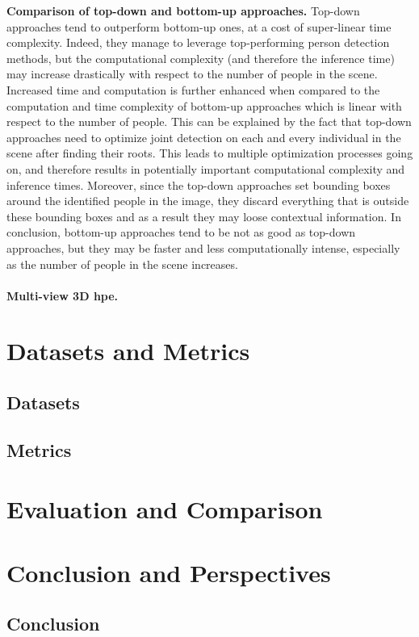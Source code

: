 \documentclass[runningheads]{llncs}
\begin{document}
\textbf{Comparison of top-down and bottom-up approaches.} Top-down approaches tend to outperform bottom-up ones, at a cost of super-linear time complexity. Indeed, they manage to leverage top-performing person detection methods, but the computational complexity (and therefore the inference time) may increase drastically with respect to the number of people in the scene. Increased time and computation is further enhanced when compared to the computation and time complexity of bottom-up approaches which is linear with respect to the number of people. This can be explained by the fact that top-down approaches need to optimize joint detection on each and every individual in the scene after finding their roots. This leads to multiple optimization processes going on, and therefore results in potentially important computational complexity and inference times. Moreover, since the top-down approaches set bounding boxes around the identified people in the image, they discard everything that is outside these bounding boxes and as a result they may loose contextual information. In conclusion, bottom-up approaches tend to be not as good as top-down approaches, but they may be faster and less computationally intense, especially as the number of people in the scene increases.


\paragraph{Multi-view 3D \ac{hpe}.}

\section{Datasets and Metrics}
\subsection{Datasets}
\subsection{Metrics}

\section{Evaluation and Comparison}

\section{Conclusion and Perspectives}
\subsection{Conclusion}
\end{document}
